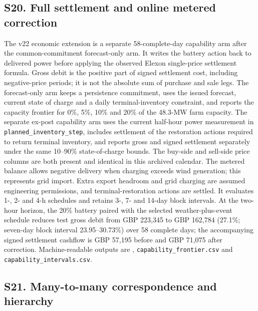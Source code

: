 \documentclass[a4paper,11pt]{article}
\begin{document}
\subsection{S20. Full settlement and online metered correction}\label{s20.-full-settlement-and-online-metered-correction}

The v22 economic extension is a separate 58-complete-day capability arm after the common-commitment forecast-only arm. It writes the battery action back to delivered power before applying the observed Elexon single-price settlement formula. Gross debit is the positive part of signed settlement cost, including negative-price periods; it is not the absolute sum of purchase and sale legs. The forecast-only arm keeps a persistence commitment, uses the issued forecast, current state of charge and a daily terminal-inventory constraint, and reports the capacity frontier for 0\%, 5\%, 10\% and 20\% of the 48.3-MW farm capacity. The separate ex-post capability arm uses the current half-hour power measurement in \texttt{planned\_inventory\_step}, includes settlement of the restoration actions required to return terminal inventory, and reports gross and signed settlement separately under the same 10--90\% state-of-charge bounds. The buy-side and sell-side price columns are both present and identical in this archived calendar. The metered balance allows negative delivery when charging exceeds wind generation; this represents grid import. Extra export headroom and grid charging are assumed engineering permissions, and terminal-restoration actions are settled. It evaluates 1-, 2- and 4-h schedules and retains 3-, 7- and 14-day block intervals. At the two-hour horizon, the 20\% battery paired with the selected weather-plus-event schedule reduces test gross debit from GBP 223,345 to GBP 162,784 (27.1\%; seven-day block interval 23.95--30.73\%) over 58 complete days; the accompanying signed settlement cashflow is GBP 57,195 before and GBP 71,075 after correction. Machine-readable outputs are , \texttt{capability\_frontier.csv} and \texttt{capability\_intervals.csv}.

\subsection{S21. Many-to-many correspondence and hierarchy}\label{s21.-many-to-many-correspondence-and-hierarchy}
\end{document}
